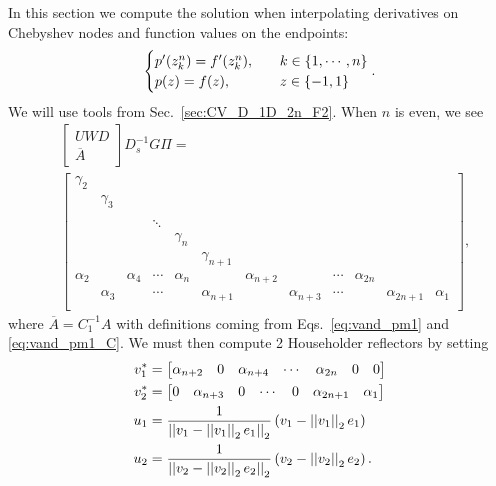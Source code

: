 In this section we compute the solution when interpolating
derivatives on Chebyshev nodes and function values on the endpoints:
%
\begin{equation}
    \begin{cases}
        p'(z_{k}^{n}) = f'(z_{k}^{n}), &\quad k\in\left\{ 1,\cdots,n \right\} \\
        p(z) = f(z), &\quad z\in\left\{ -1,1 \right\}
    \end{cases}.
\end{equation}
%
We will use tools from Sec.~\ref{sec:CV_D_1D_2n_F2}.
When $n$ is even, we see
%
\begin{align}
    &\begin{bmatrix} UWD \\ \overline{A} \end{bmatrix}D_{s}^{-1}G\Pi
        = \nonumber\\
    &\begin{bmatrix}
            \gamma_{2} & \\
            & \gamma_{3} & \\
            & & & \\
            &   &   & \ddots \\
            & & & & \gamma_{n} & \\
            & & & & & \gamma_{n+1} & \\
            \alpha_{2} & & \alpha_{4} & \cdots & \alpha_{n} & &
                \alpha_{n+2} & & \cdots & \alpha_{2n} & & \\
            & \alpha_{3} & & \cdots & & \alpha_{n+1} &
                & \alpha_{n+3} & \cdots & & \alpha_{2n+1} & \alpha_{1} \\
            \end{bmatrix},
\end{align}
%
where $\overline{A} = C_{1}^{-1}A$ with definitions coming from 
Eqs.~\eqref{eq:vand_pm1} and \eqref{eq:vand_pm1_C}.
We must then compute 2 Householder reflectors by setting
%
\begin{align}
    v_{1}^{*} &= \begin{bmatrix} \alpha_{n+2} & 0 & \alpha_{n+4} & \cdots &
                \alpha_{2n} & 0 & 0 \end{bmatrix} \nonumber\\
    v_{2}^{*} &= \begin{bmatrix} 0 & \alpha_{n+3} & 0 & \cdots &
                0 & \alpha_{2n+1} & \alpha_{1} \end{bmatrix} \nonumber\\
    u_{1} &= \frac{1}{\left| \left| v_{1} - \left| \left| v_{1} \right| \right|_{2}e_{1} \right| \right|_{2}}
                \left( v_{1} - \left| \left| v_{1} \right| \right|_{2}e_{1} \right) \nonumber\\
    u_{2} &= \frac{1}{\left| \left| v_{2} - \left| \left| v_{2} \right| \right|_{2}e_{2} \right| \right|_{2}}
                \left( v_{2} - \left| \left| v_{2} \right| \right|_{2}e_{2} \right).
\end{align}

